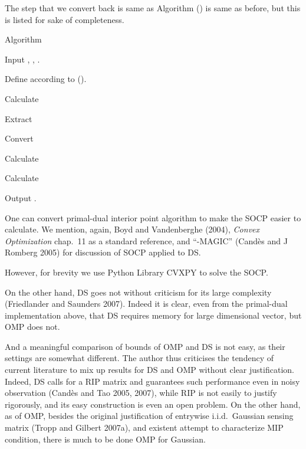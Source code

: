 The step that we convert  back is same as Algorithm () is same as before, but this is listed for sake of completeness.

\Result
{Algorithm}
{
\startitemize[n]
\item Input , , .
\item Define  according to ().
\item Calculate
\item Extract
\item Convert 
\item Calculate
\item Calculate
\item Output .
\stopitemize
}

\stopsection

\startsection [title={Simulation}]

One can convert primal-dual interior point algorithm to make the SOCP easier to calculate.
We mention, again, Boyd and Vandenberghe (2004), {\it Convex Optimization} chap.\ 11 as a standard reference, and ``-MAGIC'' (Cand\`es and J Romberg 2005) for discussion of SOCP applied to DS.

However, for brevity we use Python Library CVXPY to solve the SOCP.

\stopsection

\startsection [title={Discussion}]

On the other hand, DS goes not without criticism for its large complexity (Friedlander and Saunders 2007).
Indeed it is clear, even from the primal-dual implementation above, that DS requires memory for large dimensional vector, but OMP does not.

And a meaningful comparison of bounds of OMP and DS is not easy, as their settings are somewhat different.
The author thus criticises the tendency of current literature to mix up results for DS and OMP without clear justification.
Indeed, DS calls for a RIP matrix and guarantees such performance even in noisy observation (Cand\`es and Tao 2005, 2007), while RIP is not easily to justify rigorously, and its easy construction is even an open problem.
On the other hand, as of OMP, besides the original justification of entrywise i.i.d.\ Gaussian sensing matrix (Tropp and Gilbert 2007a), and existent attempt to characterize MIP condition, there is much to be done OMP for Gaussian.

\stopsection

\stopchapter
